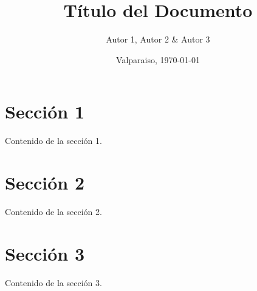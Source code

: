 \documentclass[11pt, letterpaper]{article}
\title{Título del Documento}
\author{Autor 1, Autor 2 \& Autor 3}
\date{Valparaiso, \today}
\begin{document}
\maketitle

\section{Sección 1}

Contenido de la sección 1.

\section{Sección 2}

Contenido de la sección 2.

\section{Sección 3}

Contenido de la sección 3.
\end{document}
